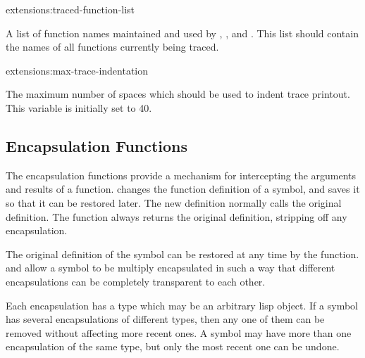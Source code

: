 \begin{defvar}{extensions:}{traced-function-list}
  
  A list of function names maintained and used by ,
  , and .  This list should contain
  the names of all functions currently being traced.
\end{defvar}

\begin{defvar}{extensions:}{max-trace-indentation}
  
  The maximum number of spaces which should be used to indent trace
  printout.  This variable is initially set to 40.
\end{defvar}


\subsection{Encapsulation Functions}

The encapsulation functions provide a mechanism for intercepting the
arguments and results of a function.   changes the
function definition of a symbol, and saves it so that it can be
restored later.  The new definition normally calls the original
definition.  The \clisp{}  function always returns
the original definition, stripping off any encapsulation.

The original definition of the symbol can be restored at any time by
the  function.   and 
allow a symbol to be multiply encapsulated in such a way that different
encapsulations can be completely transparent to each other.

Each encapsulation has a type which may be an arbitrary lisp object.
If a symbol has several encapsulations of different types, then any
one of them can be removed without affecting more recent ones.
A symbol may have more than one encapsulation of the same type, but
only the most recent one can be undone.

